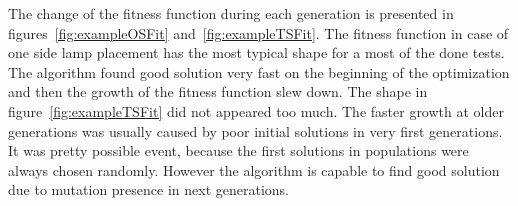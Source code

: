 The change of the fitness function during each generation is  presented in figures~\ref{fig:exampleOSFit} and~\ref{fig:exampleTSFit}. The fitness function in case of one side lamp placement has the most typical shape for a most of the done tests. The algorithm found good solution very fast on the beginning of the optimization and then the growth of the fitness function slew down. The shape in figure~\ref{fig:exampleTSFit} did not appeared too much. The faster growth at older generations was usually caused by poor initial solutions in very first generations. It was pretty possible event, because the first solutions in populations were always chosen randomly. However the algorithm is capable to find good solution due to mutation presence in next generations.


\begin{figure}[t]
        \centering
        \\
        \\

\end{figure}
